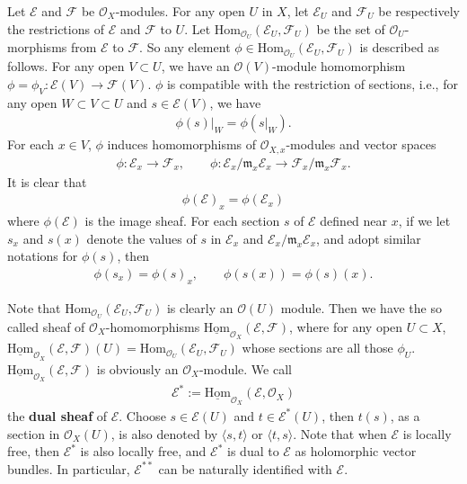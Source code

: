 \documentclass[12pt,a4paper,notitlepage]{report}
\theoremstyle{definition}
\theoremstyle{plain}
\newcommand{\fk}{\mathfrak}
\newcommand{\Hom}{\mathrm{Hom}}
\newcommand{\bk}[1]{\langle {#1}\rangle}
\newcommand{\scr}{\mathscr}
\newcommand{\shom}{\underline{\Hom}}
\numberwithin{equation}{section}
\begin{document}
Let $\scr E$ and $\scr F$ be $\scr O_X$-modules. For any open $U$ in $X$, let $\scr E_U$ and $\scr F_U$ be respectively the restrictions of $\scr E$ and $\scr F$ to $U$. Let $\Hom_{\scr O_U}(\scr E_U,\scr F_U)$ \index{Hom@$\Hom_{\scr O_U}(\scr E_U,\scr F_U)$} be the set of $\scr O_U$-morphisms from $\scr E$ to $\scr F$. So any element  $\phi\in\Hom_{\scr O_U}(\scr E_U,\scr F_U)$ is
described as follows. For any open $V\subset U$, we have an $\scr O(V)$-module homomorphism $\phi=\phi_V:\scr E(V)\rightarrow \scr F(V)$. $\phi$ is compatible with the restriction of sections, i.e., for any open $W\subset V\subset U$ and $s\in\scr E(V)$, we have 
\begin{align*}
\phi(s)|_W=\phi(s|_W).
\end{align*}
For each $x\in V$, $\phi$ induces homomorphisms of $\scr O_{X,x}$-modules and vector spaces
\begin{gather}
\phi:\scr E_x\rightarrow\scr F_x,\qquad \phi:\scr E_x/\fk m_x\scr E_x\rightarrow \scr F_x/\fk m_x\scr F_x.\label{eq223}
\end{gather}
It is clear that
\begin{align}
\phi(\scr E)_x=\phi(\scr E_x)	
\end{align}
where $\phi(\scr E)$ is the image sheaf. For each section $s$ of $\scr E$ defined near $x$, if we let $s_x$ and $s(x)$ denote the values of $s$ in $\scr E_x$ and $\scr E_x/\fk m_x\scr E_x$, and adopt similar notations for $\phi(s)$, then
\begin{gather}
\phi(s_x)=\phi(s)_x,\qquad \phi(s(x))=\phi(s)(x).\label{eq224}
\end{gather}


Note that  $\Hom_{\scr O_U}(\scr E_U,\scr F_U)$ is clearly an $\scr O(U)$ module. Then we have the so called sheaf of $\scr O_X$-homomorphisms $\shom_{\scr O_X}(\scr E,\scr F)$, \index{Hom@$\shom_{\scr O_X}(\scr E,\scr F)$} where for any open  $U\subset X$, $\shom_{\scr O_X}(\scr E,\scr F)(U)=\Hom_{\scr O_U}(\scr E_U,\scr F_U)$ whose sections are all those $\phi_U$. $\shom_{\scr O_X}(\scr E,\scr F)$ is obviously an $\scr O_X$-module.  We call 
\begin{align*}
\scr E^*:=\shom_{\scr O_X}(\scr E,\scr O_X)
\end{align*}
the \textbf{dual sheaf} of $\scr E$. \index{E@$\scr E^*$} Choose $s\in\scr E(U)$ and $t\in\scr E^*(U)$, then $t(s)$, as a section in $\scr O_X(U)$, is also denoted by $\bk{s,t}$ or $\bk{t,s}$.  Note that when $\scr E$ is locally free, then $\scr E^*$ is also locally free, and $\scr E^*$ is dual to $\scr E$ as holomorphic vector bundles. In particular, $\scr E^{**}$ can be naturally identified with $\scr E$. 
\end{document}
